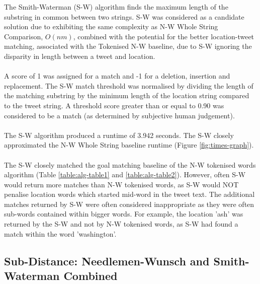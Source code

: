 \documentclass[11pt,a4paper]{article}
\begin{document}
The Smith-Waterman (S-W) algorithm finds the maximum length of the substring in common between two strings. S-W was considered as a candidate solution due to exhibiting the same complexity as N-W Whole String Comparison, $O(nm)$, combined with the potential for the better location-tweet matching, associated with the Tokenised N-W baseline, due to  S-W ignoring the disparity in length between a tweet and location.\\\\
A score of 1 was assigned for a match and -1 for a deletion, insertion and replacement. The S-W match threshold was normalised by dividing the length of the matching substring by the minimum length of the location string compared to the tweet string. A threshold score greater than or equal to 0.90 was considered to be a match (as determined by subjective human judgement).\\\\
The S-W algorithm produced a runtime of 3.942 seconds. The S-W closely approximated the N-W Whole String baseline runtime (Figure \ref{fig:times-graph}).\\\\      
The S-W closely matched the goal matching baseline of the N-W tokenised words algorithm (Table \ref{table:alg-table1} and \ref{table:alg-table2}). However, often S-W would return more matches than N-W tokenised words, as S-W would NOT penalise location words which started mid-word in the tweet text. The additional matches returned by S-W were often considered inappropriate as they were often sub-words contained within bigger words. For example, the location 'ash' was returned by the S-W and not by N-W tokenised words, as S-W had found a match within the word 'washington'.    

\subsection{Sub-Distance: Needlemen-Wunsch and Smith-Waterman Combined}
\end{document}
